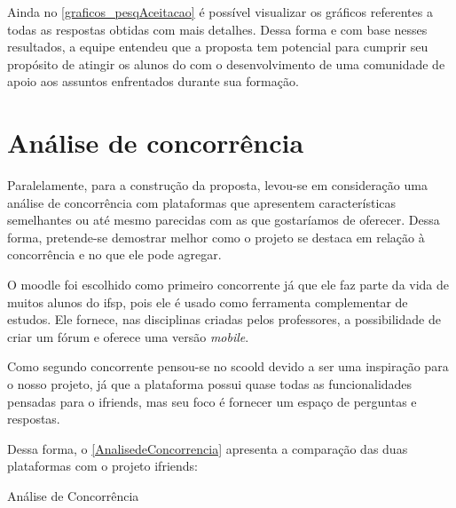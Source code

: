 Ainda no \autoref{graficos_pesqAceitacao} é possível visualizar os gráficos referentes a todas as respostas obtidas com mais detalhes. Dessa forma e com base nesses resultados, a equipe entendeu que a proposta tem potencial para cumprir seu propósito de atingir os alunos do  com o desenvolvimento de uma comunidade de apoio aos assuntos enfrentados durante sua formação.

\section{Análise de concorrência}
Paralelamente, para a construção da proposta, levou-se em consideração uma análise de concorrência com plataformas que apresentem características semelhantes ou até mesmo parecidas com as que gostaríamos de oferecer. Dessa forma, pretende-se demostrar melhor como o projeto se destaca em relação à concorrência e no que ele pode agregar.

O \gls{moodle} foi escolhido como primeiro concorrente já que ele faz parte da vida de muitos alunos do \acs{ifsp}, pois ele é usado como ferramenta complementar de estudos. Ele fornece, nas disciplinas criadas pelos professores, a possibilidade de criar um fórum e oferece uma versão \textsl{mobile}.

Como segundo concorrente pensou-se no \gls{scoold} devido a ser uma inspiração para o nosso projeto, já que a plataforma possui quase todas as funcionalidades pensadas para o \gls{ifriends}, mas seu foco é fornecer um espaço de perguntas e respostas. 

Dessa forma, o \autoref{AnalisedeConcorrencia} apresenta a comparação das duas plataformas com o projeto \gls{ifriends}:

\def\arraystretch{2}
\begin{quadro}[htb]
\centering
\ABNTEXfontereduzida
\caption{Análise de Concorrência}
\label{AnalisedeConcorrencia}
\end{quadro}
\FloatBarrier

